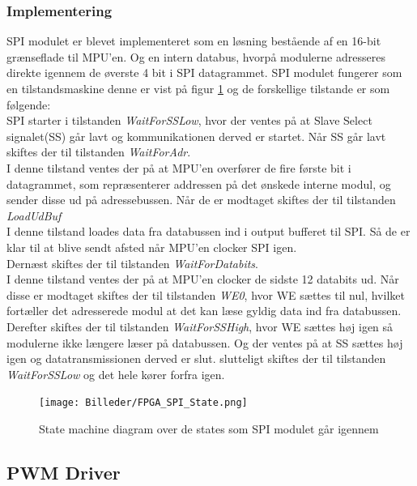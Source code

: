 \subsubsection{Implementering}
SPI modulet er blevet implementeret som en løsning bestående af en 16-bit grænseflade til MPU'en. Og en intern databus, hvorpå modulerne adresseres direkte igennem de øverste 4 bit i SPI datagrammet. SPI modulet fungerer som en tilstandsmaskine denne er vist på figur \ref{fig:FPGA_SPI_State} og de forskellige tilstande er som følgende:\\
SPI starter i tilstanden \textit{WaitForSSLow}, hvor der ventes på at Slave Select signalet(SS) går lavt og kommunikationen derved er startet. Når SS går lavt skiftes der til tilstanden \textit{WaitForAdr}. \\ 
I denne tilstand ventes der på at MPU'en overfører de fire første bit i datagrammet, som repræsenterer addressen på det ønskede interne modul, og sender disse ud på adressebussen. Når de er modtaget skiftes der til tilstanden \textit{LoadUdBuf} \\
I denne tilstand loades data fra databussen ind i output bufferet til SPI. Så de er klar til at blive sendt afsted når MPU'en clocker SPI igen.\\
Dernæst skiftes der til tilstanden \textit{WaitForDatabits}. \\
I denne tilstand ventes der på at MPU'en clocker de sidste 12 databits ud. Når disse er modtaget skiftes der til tilstanden \textit{WE0}, hvor WE sættes til nul, hvilket fortæller det adresserede modul at det kan læse gyldig data ind fra databussen. \\ Derefter skiftes der til tilstanden \textit{WaitForSSHigh}, hvor WE sættes høj igen så modulerne ikke længere læser på databussen. Og der ventes på at SS sættes høj igen og datatransmissionen derved er slut. slutteligt skiftes der til tilstanden \textit{WaitForSSLow} og det hele kører forfra igen.

\begin{figure}[ht]
	\begin{center}
		\texttt{[image: Billeder/FPGA\_SPI\_State.png]}
	\end{center}
\caption{State machine diagram over de states som SPI modulet går igennem}
\label{fig:FPGA_SPI_State}
\end{figure}

\subsection{PWM Driver}

